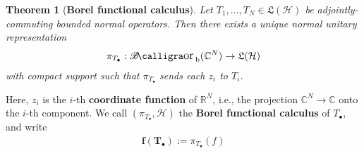 \documentclass[12pt,b5paper,notitlepage]{article}
\theoremstyle{definition}
\theoremstyle{plain}
\newtheorem{thm}[df]{Theorem}
\DeclareMathOperator{\Borb}{{\mathscr{B}\text{\kern -2pt {\calligra\large or}}\,}_{\mathrm b}}
\newcommand{\fk}{\mathfrak}
\newcommand{\blt}{\bullet}
\newcommand{\Cbb}{\mathbb C}
\newcommand{\Rbb}{\mathbb R}
\newcommand{\MH}{\mathcal H}
\numberwithin{equation}{section}
\begin{document}
\begin{thm}[\textbf{Borel functional calculus}]\label{lb331}
Let $T_1,\dots,T_N\in\fk L(\MH)$ be adjointly-commuting bounded normal operators. Then there exists a unique normal unitary representation
\begin{align*}
\pi_{T_\blt}:\Borb(\Cbb^N)\rightarrow\fk L(\MH)
\end{align*}
with compact support such that $\pi_{T_\blt}$ sends each $z_i$ to $T_i$.
\end{thm}

Here, $z_i$ is the $i$-th \textbf{coordinate function} of $\Rbb^N$, i.e., the projection $\Cbb^N\rightarrow\Cbb$ onto the $i$-th component. We call $(\pi_{T_\blt},\MH)$ the \textbf{Borel functional calculus}  of $T_\blt$, and write
\begin{align*}
\pmb{f(T_\blt)}:=\pi_{T_\blt}(f)
\end{align*}
\end{document}
